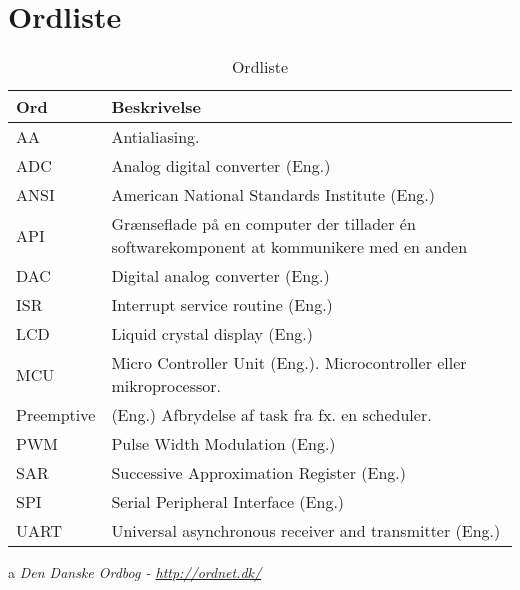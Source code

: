 \chapter{Ordliste} \label{bilag:ordliste}

\begin{table}[h!]
	\caption{Ordliste}
	\label{tab:ordliste}
	\begin{threeparttable}
		\begin{tabular}{l p{}}
			\toprule
			\textbf{Ord}      & \textbf{Beskrivelse}   \\ 
			\midrule
			AA			& Antialiasing.\\
			ADC			& Analog digital converter (Eng.)\\
			ANSI		& American National Standards Institute (Eng.)\\
			API			& Grænseflade på en computer der tillader én softwarekomponent at kommunikere med en anden\tnote{a}\\
			DAC			& Digital analog converter (Eng.)\\
			ISR			 & Interrupt service routine (Eng.) \\
			LCD			& Liquid crystal display (Eng.) \\
			MCU       	& Micro Controller Unit (Eng.). Microcontroller eller mikroprocessor. \\
			Preemptive	& (Eng.) Afbrydelse af task fra fx. en scheduler.\\
			PWM			& Pulse Width Modulation (Eng.) \\
			SAR			& Successive Approximation Register (Eng.)\\
			SPI			& Serial Peripheral Interface (Eng.)  \\
			UART		& Universal asynchronous receiver and transmitter (Eng.)\\
			\bottomrule
		\end{tabular}
	
		\begin{tablenotes}
			\item[a] \textit{Den Danske Ordbog - \url{http://ordnet.dk/}}
		\end{tablenotes}
	\end{threeparttable}
\end{table}
